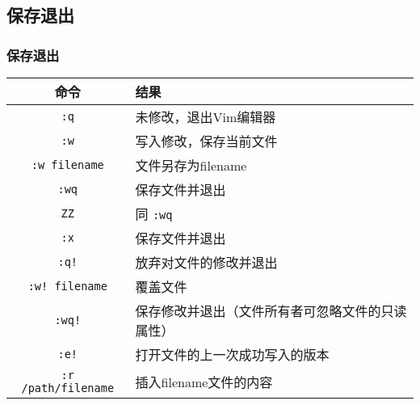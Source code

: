 \subsection{保存退出}
\begin{frame}
  \frametitle{\alert{保存退出}}
  \begin{table}
    \centering
    \begin{tabularx}{\textwidth}{cX}
      \hline
      \rowcolor{blue!50}命令 & 结果\\
      \hline
      \verb|:q| & 未修改，退出Vim编辑器\\
      \verb|:w| & 写入修改，保存当前文件\\
      \verb|:w filename| & 文件另存为filename\\
      \verb|:wq| & 保存文件并退出\\
      \verb|ZZ| & 同 \verb|:wq|\\
      \verb|:x| & 保存文件并退出\\
      \hline
      \verb|:q!| & 放弃对文件的修改并退出\\
      \verb|:w! filename| & 覆盖文件\\
      \verb|:wq!| & 保存修改并退出（文件所有者可忽略文件的只读属性）\\
      \hline
      \verb|:e!| & 打开文件的上一次成功写入的版本\\
      \verb|:r /path/filename| & 插入filename文件的内容\\
      \hline
    \end{tabularx}
  \end{table}
\end{frame}

